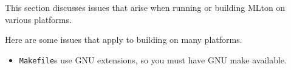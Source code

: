 %
This section discusses issues that arise when running or building
MLton on various platforms.

Here are some issues that apply to building {\mlton} on many
platforms.

\begin{itemize}

\item {\mlton} {\tt Makefile}s use GNU extensions, so you must have
GNU make available.

\end{itemize}










